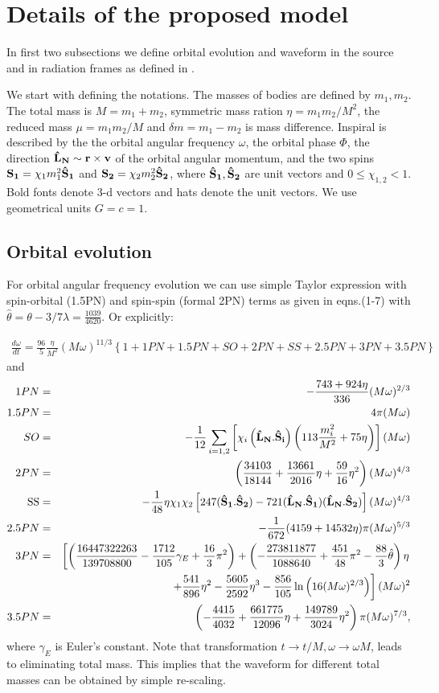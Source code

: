 \documentclass[11pt]{report}
\def\bea{\begin{eqnarray}}
\def\ena{\end{eqnarray}}
\def\bSo{{\bf \hat{S}_1}}
\def\bSt{{\bf \hat{S}_2}}
\def\bL{{\bf \hat{L}_{N}}}
\begin{document}
\section{Details of the proposed model}

In first two subsections we define orbital evolution and 
waveform in the source and in radiation frames as defined 
in \cite{FC, Kidder, BCV2}.

We start with defining the notations. The masses of bodies
are defined by $m_1, m_2$. The total mass is $M=m_1+m_2$,
symmetric mass ration $\eta = m_1m_2/M^2$, the reduced 
mass $\mu = m_1m_2/M$ and $\delta m = m_1-m_2$ is mass difference.
 Inspiral is described by the the 
orbital angular frequency $\omega$, the orbital phase $\Phi$,
the direction $\bL \sim \bf{r\times v}$ of the orbital angular momentum, and the two spins ${\bf S_1} =  \chi_1m_1^2 \bSo$
and ${\bf S_2} = \chi_2m_2^2 \bSt$, where $\bSo, \bSt$ are 
unit vectors and $0\le \chi_{1,2} < 1$. Bold fonts denote 
3-d vectors and hats denote the unit vectors. We use geometrical
units $G=c=1$.

\subsection{Orbital evolution}

For orbital angular frequency evolution we can use 
simple Taylor expression with spin-orbital (1.5PN) and
spin-spin (formal 2PN) terms as given in \cite{BCPV}
eqns.(1-7) with $\hat{\theta} = \theta -3/7\lambda = 
\frac{1039}{4620}$.
Or explicitly:

\bea
\frac{d\omega}{dt} = \frac{96}{5}\frac{\eta}{M^2}(M\omega)^{11/3}
\left\{ 1 + 1PN + 1.5PN + SO + 2PN + SS + 2.5PN + 3PN + 3.5PN\right\}
\label{domdt}
\ena
and
\bea
1PN &=& -\frac{743 + 924\eta}{336}(M\omega)^{2/3} \\
1.5PN &=& 4\pi (M\omega) \\
SO &=& -\frac1{12}\sum_{i=1,2}\left[ 
\chi_i\left(\bL.{\bf \hat{S}_i}\right)\left(113\frac{m_i^2}{M^2} + 75\eta\right)
\right](M\omega)\\
2PN &=& \left( \frac{34103}{18144} +\frac{13661}{2016}\eta +\frac{59}{16}\eta^2
\right) (M\omega)^{4/3}\\
\SS &=& -\frac1{48}\eta\chi_1\chi_2\left[ 247(\bSo.\bSt) - 721(\bL.\bSo)(\bL.\bSt)
\right](M\omega)^{4/3}\\
2.5PN &=& -\frac1{672}(4159 + 14532\eta)\pi (M\omega)^{5/3}\\
3PN &=& \left[ \left( \frac{16 447 322 263}{139 708 800} - \frac{1 712}{105}
\gamma_{E} + \frac{16}{3}\pi^2\right) + \left( -\frac{273 811 877}{1 088 640}
+ \frac{451}{48}\pi^2 -\frac{88}{3}\hat{\theta} \right)\eta\right.\nonumber\\
& & \left. + \frac{541}{896}\eta^2 - \frac{5 605}{2 592}\eta^3 - \frac{856}{105}
\ln\left(16(M\omega)^{2/3}\right)\right](M\omega)^{2}\\
3.5PN &=& \left( -\frac{4415}{4032} + \frac{661 775}{12096}\eta + 
\frac{149 789}{3 024}\eta^2\right)\pi (M\omega)^{7/3},
\ena
where $\gamma_{E}$ is Euler's constant. 
Note that transformation $t\to t/M, \omega \to \omega M$,
leads to eliminating total mass. This implies that the waveform
for different total masses can be obtained by simple re-scaling.
\end{document}
